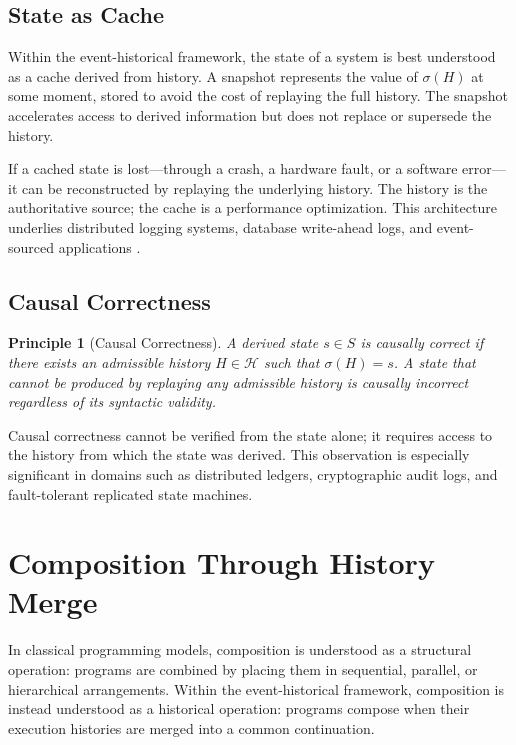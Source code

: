 \documentclass[12pt]{article}
\newtheorem{principle}{Principle}
\begin{document}
\subsection{State as Cache}

Within the event-historical framework, the state of a system is best understood as a cache
derived from history. A snapshot represents the value of $\sigma(H)$ at some moment, stored to
avoid the cost of replaying the full history. The snapshot accelerates access to derived
information but does not replace or supersede the history.

If a cached state is lost---through a crash, a hardware fault, or a software error---it can be
reconstructed by replaying the underlying history. The history is the authoritative source;
the cache is a performance optimization. This architecture underlies distributed logging
systems, database write-ahead logs, and event-sourced applications \cite{fowler2005,
kleppmann2017}.

\subsection{Causal Correctness}

\begin{principle}[Causal Correctness]
A derived state $s \in S$ is \emph{causally correct} if there exists an admissible history
$H \in \mathcal{H}$ such that $\sigma(H) = s$. A state that cannot be produced by replaying any
admissible history is causally incorrect regardless of its syntactic validity.
\end{principle}

Causal correctness cannot be verified from the state alone; it requires access to the history
from which the state was derived. This observation is especially significant in domains such
as distributed ledgers, cryptographic audit logs, and fault-tolerant replicated state machines.

\section{Composition Through History Merge}
\label{sec:composition}

In classical programming models, composition is understood as a structural operation: programs
are combined by placing them in sequential, parallel, or hierarchical arrangements. Within the
event-historical framework, composition is instead understood as a historical operation:
programs compose when their execution histories are merged into a common continuation.
\end{document}

